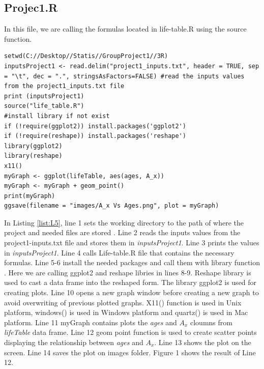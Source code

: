 \documentclass[12pt]{article}
\def\StartLineAtOne{\lstset{firstnumber=1}}
\begin{document}
\subsection{Projec1.R}
\hspace{1 cm}In this file, we are calling the formulas located in life-table.R using the source function.
\StartLineAtOne
\begin{lstlisting}[caption={ The Relationship between $A_{x}$ and Ages},captionpos=b,label={list:L5}]
setwd(C://Desktop//Statis//GroupProject1//3R)
inputsProject1 <- read.delim("project1_inputs.txt", header = TRUE, sep = "\t", dec = ".", stringsAsFactors=FALSE) #read the inputs values from the project1_inputs.txt file
print (inputsProject1)
source("life_table.R")
#install library if not exist
if (!require(ggplot2)) install.packages('ggplot2')
if (!require(reshape)) install.packages('reshape')
library(ggplot2)
library(reshape)
x11()
myGraph <- ggplot(lifeTable, aes(ages, A_x))
myGraph <- myGraph + geom_point()
print(myGraph)
ggsave(filename = "images/A_x Vs Ages.png", plot = myGraph)
\end{lstlisting}
In Listing \ref{list:L5}, line 1 sets the working directory to the path of where the project and needed files are stored . Line 2 reads the inputs values from the project1-inputs.txt file and stores them in \textit{inputsProject1}. Line 3 prints the values in \textit{inputsProject1}. Line 4 calls Life-table.R file that contains the necessary formulas. Line 5-6  install the needed packages and call them with library function . Here we are calling ggplot2 and reshape libries in lines 8-9. Reshape library  is used to cast a data frame into the reshaped form. The library ggplot2 is used for creating plots. Line 10 opens a new graph window before creating a new graph to avoid overwriting of previous plotted graphs. X11() function is used in Unix platform, windows() is used in Windows platform and quartz() is used in Mac platform. Line 11 myGraph contains plots the \textit{ages} and $A_{x}$ cloumns from \textit{lifeTable} data frame. Line 12 geom point function is used to create scatter points displaying the relationship between \textit{ages} and $A_{x}$. Line 13 shows the plot on the screen. Line 14 saves the plot on images folder. Figure 1 shows the result of Line 12.
\end{document}
